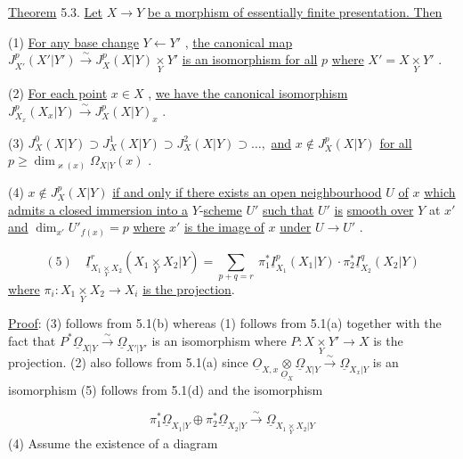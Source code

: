 \underline{Theorem} 5.3.  \underline{Let}  $X \to Y$  \underline{be a morphism of essentially finite presentation. Then}

(1)  \underline{For any base change}  $Y \leftarrow Y'$ , \underline{the canonical map} $J^p_{X'}(X'|Y') \xrightarrow{\sim} J^p_X(X|Y) \underset{Y}{\times} Y'$  \underline{is an isomorphism for all}  $p$  \underline{where}  $X' = X \underset{Y}{\times} Y'$ .

(2)  \underline{For each point}  $x \in X$ , \underline{we have the canonical isomorphism} $J^p_{X_x}(X_x|Y) \xrightarrow{\sim} J^p_X(X|Y)_x$ .

(3)  $J^0_X(X|Y) \supset J^1_X(X|Y) \supset J^2_X(X|Y) \supset \dots,$  \underline{and}  $x \notin J^p_X(X|Y)$  \underline{for all} $p \geq \dim_{\varkappa(x)} \Omega_{X|Y}(x)$ .

(4)  $x \notin J^p_X(X|Y)$  \underline{if and only if there exists an open neighbourhood}  $U$ \underline{of}  $x$  \underline{which admits a closed immersion into a}  $Y$-\underline{scheme}  $U'$  \underline{such that}  $U'$  \underline{is} \underline{smooth over}  $Y$  at  $x'$  \underline{and}  $\dim_{x'} U'_{f(x)} = p$  \underline{where}  $x'$  \underline{is the image of}  $x$  \underline{under} $U \to U'$ .

\begin{equation*}
(5) \quad \underline{I}^r_{X_1 \underset{Y}{\times} X_2}(X_1 \underset{Y}{\times} X_2 | Y) = \sum_{p+q=r} \ \pi_1^* \underline{I}^p_{X_1}(X_1|Y) \cdot \pi_2^* \underline{I}^q_{X_2}(X_2|Y)
\end{equation*}
\underline{where}  $\pi_i : X_1 \underset{Y}{\times} X_2 \to X_i$  \underline{is the projection}.

\underline{Proof}:  (3) follows from 5.1(b) whereas (1) follows from 5.1(a) together with the fact that  $P^*\underline{\Omega}_{X|Y} \xrightarrow{\sim} \underline{\Omega}_{X'|Y'}$  is an isomorphism where  $P : X \underset{Y}{\times} Y' \to X$  is the projection. (2) also follows from 5.1(a) since  $\underline{O}_{X,x} \underset{\underline{O}_X}{\otimes} \underline{\Omega}_{X|Y} \xrightarrow{\sim} \underline{\Omega}_{X_x|Y}$  is an isomorphism (5) follows from 5.1(d) and the isomorphism

\begin{equation*}
\pi_1^*\underline{\Omega}_{X_1|Y} \oplus \pi_2^*\underline{\Omega}_{X_2|Y} \xrightarrow{\sim} \underline{\Omega}_{X_1 \underset{Y}{\times} X_2|Y}
\end{equation*}
(4)  Assume the existence of a diagram

